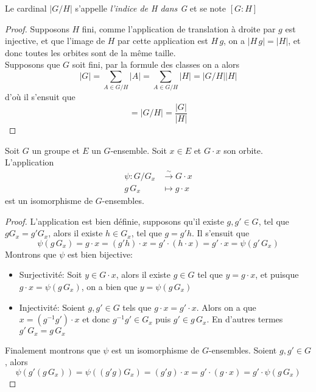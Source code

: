 \begin{notation}
	Le cardinal $|G/H|$ s'appelle \emph{l'indice de H dans G} et se note
	$[G : H]$
\end{notation}

\begin{proof}
	Supposons $H$ fini, comme l'application de translation à droite par $g$ est injective,
	et que l'image de $H$ par cette application est $H\,g$,
	on a $|H\,g| = |H|$, et donc toutes les orbites sont de la même taille.\\
	Supposons que $G$ soit fini, par la formule des classes on a alors
	\begin{equation*}
		|G| = \sum_{A \in G/H}|A| = \sum_{A \in G/H}|H| = |G/H||H|
	\end{equation*}
	d'où il s'ensuit que
	\begin{equation*}
		[G:H] = |G/H| = \frac{|G|}{|H|}
	\end{equation*}
\end{proof}

\begin{theorem}
	Soit $G$ un groupe et $E$ un $G$-ensemble.
	Soit $x \in E$ et $G \cdot x$ son orbite.
	L'application
	\begin{align*}
		\psi : G/G_x &\xrightarrow{\sim} G \cdot x\\
		g\,G_x &\mapsto g \cdot x
	\end{align*}
	est un isomorphisme de $G$-ensembles.
\end{theorem}

\begin{proof}
	L'application est bien définie, supposons qu'il existe $g, g' \in G$,
	tel que $g G_x = g' G_x$, alors il existe $h \in G_x$,
	tel que $g = g' h$. Il s'ensuit que
	\begin{equation*}
		\psi(g\,G_x) = g \cdot x = (g' h) \cdot x
		= g' \cdot (h \cdot x) = g' \cdot x = \psi(g'\,G_x)
	\end{equation*}
	Montrons que $\psi$ est bien bijective:
	\begin{itemize}
		\item Surjectivité: Soit $y \in G \cdot x$, alors il existe $g \in G$
			tel que $y = g \cdot x$, et puisque $g \cdot x = \psi(g\,G_x)$,
			on a bien que $y = \psi(g\,G_x)$
		\item Injectivité: Soient $g, g' \in G$ tels que
			$g \cdot x = g' \cdot x$. Alors on a que $x = (g^{-1} g') \cdot x$ et donc
			$g^{-1} g' \in G_x$ puis $g' \in g\,G_x$.
			En d'autres termes $g'\,G_x = g\,G_x$
	\end{itemize}
	Finalement montrons que $\psi$ est un isomorphisme de $G$-ensembles.
	Soient $g, g'\in G$, alors
	\begin{equation*}
		\psi(g'(g\,G_x)) = \psi((g' g) G_x)
			= (g' g) \cdot x = g' \cdot (g \cdot x) = g' \cdot \psi(g\,G_x)
	\end{equation*}
\end{proof}

